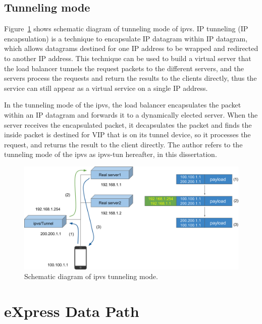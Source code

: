 \subsection{Tunneling mode}

Figure~\ref{fig:ipvs-tun-schem} shows schematic diagram of tunneling mode of ipvs.
IP tunneling (IP encapsulation) is a technique to encapsulate IP datagram within IP datagram, which allows datagrams destined for one IP address to be wrapped and redirected to another IP address. This technique can be used to build a virtual server that the load balancer tunnels the request packets to the different servers, and the
servers process the requests and return the results to the clients directly, thus the service can still appear as a virtual service on a single IP address.

In the tunneling mode of the ipvs, the load balancer encapsulates the packet within an IP datagram and forwards it to a dynamically elected server. 
When the server receives the encapsulated packet, it decapsulates the packet and finds the inside packet is destined for VIP that is on its tunnel device, so it processes the request, and returns the result
to the client directly.
%
The author refers to the tunneling mode of the ipvs as ipvs-tun hereafter, in this dissertation.

\begin{figure}[h]
  \centering
  \includegraphics[width=0.9\columnwidth]{Figs/ipvs-tun-schem}

  \par\bigskip
  \centering
  \begin{minipage}{0.9\columnwidth}
    \caption[ipvs tunneling  mode]{
      Schematic diagram of ipvs tunneling mode.
    }
    \label{fig:ipvs-tun-schem}
  \end{minipage}
\end{figure}

\FloatBarrier


\section{eXpress Data Path}

